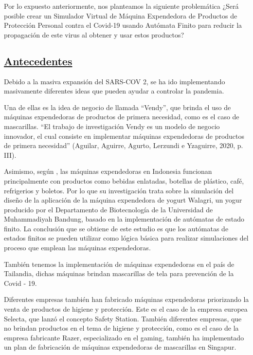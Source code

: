 \documentclass[10pt,conference]{IEEEtran}
\begin{document}
Por lo expuesto anteriormente, nos planteamos la siguiente problemática ¿Será posible crear un Simulador Virtual de Máquina Expendedora de Productos de Protección Personal contra el Covid-19 usando Autómata Finito para reducir la propagación de este virus al obtener y usar estos productos?

\subsection{\underline{\textbf{Antecedentes}}}
Debido a la masiva expansión del SARS-COV 2, se ha ido implementando masivamente diferentes ideas que pueden ayudar a controlar la pandemia.

Una de ellas es la idea de negocio de  llamada “Vendy”, que brinda el uso de máquinas expendedoras de productos de primera necesidad, como es el caso de mascarillas. “El trabajo de investigación Vendy es un modelo de negocio innovador, el cual consiste en implementar máquinas expendedoras de productos de primera necesidad” (Aguilar, Aguirre, Agurto, Lerzundi e Yzaguirre, 2020, p. III).

Asimismo, según , las máquinas expendedoras en Indonesia funcionan principalmente con productos como bebidas enlatadas, botellas de plástico, café, refrigerios y boletos. Por lo que su investigación trata sobre la simulación del diseño de la aplicación de la máquina expendedora de yogurt Walagri, un yogur producido por el Departamento de Biotecnología de la Universidad de Muhammadiyah Bandung, basado en la implementación de autómatas de estado finito. La conclusión que se obtiene de este estudio es que los autómatas de estados finitos se pueden utilizar como lógica básica para realizar simulaciones del proceso que emplean las máquinas expendedoras.

También tenemos la implementación de máquinas expendedoras en el país de Tailandia, dichas máquinas brindan mascarillas de tela para prevención de la Covid - 19.

Diferentes empresas también han fabricado máquinas expendedoras priorizando la venta de productos de higiene y protección. Este es el caso de la empresa europea Selecta, que lanzó el concepto Safety Station.
También diferentes empresas, que no brindan productos en el tema de higiene y protección, como es el caso de la empresa fabricante Razer, especializado en el gaming, también ha implementado un plan de fabricación de máquinas expendedoras de mascarillas en Singapur.
\end{document}
